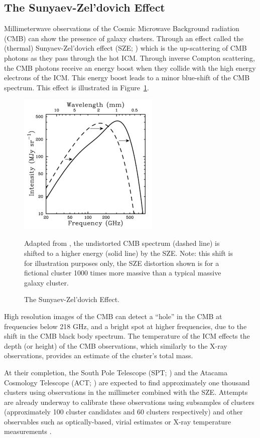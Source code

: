 \subsection{The Sunyaev-Zel'dovich Effect}
Millimeterwave observations of the Cosmic Microwave Background radiation (CMB) can show the presence of galaxy clusters. Through an effect called the (thermal) Sunyaev-Zel'dovich effect (SZE; \citealt{Sunyaev1972}) which is the up-scattering of CMB photons as they pass through the hot ICM. Through inverse Compton scattering, the CMB photons receive an energy boost when they collide with the high energy electrons of the ICM. This energy boost leads to a minor blue-shift of the CMB spectrum. This effect is illustrated in Figure~\ref{fig:sze}. 
\begin{figure}[ht]
	\begin{center}
		\includegraphics[width=0.6\textwidth]{figures/sze.pdf}
	\end{center}
	\caption{The Sunyaev-Zel'dovich Effect.}
	Adapted from \cite{Carlstrom2002a}, the undistorted CMB spectrum (dashed line) is shifted to a higher energy (solid line) by the SZE. Note: this shift is for illustration purposes only, the SZE distortion shown is for a fictional cluster 1000 times more massive than a typical massive galaxy cluster.
	\label{fig:sze}
\end{figure}
High resolution images of the CMB can detect a ``hole'' in the CMB at frequencies below 218 GHz, and a bright spot at higher frequencies, due to the shift in the CMB black body spectrum. The temperature of the ICM effects the depth (or height) of the CMB observations, which similarly to the X-ray observations, provides an estimate of the cluster's total mass. 

At their completion, the South Pole Telescope (SPT; \citealt{Carlstrom2011}) and the Atacama Cosmology Telescope (ACT; \citealt{Swetz2011}) are expected to find approximately one thousand clusters using observations in the millimeter combined with the SZE. Attempts are already underway to calibrate these observations using subsamples of clusters (approximately 100 cluster candidates and 60 clusters respectively) and other observables such as optically-based, virial estimates or X-ray temperature measurements . 

